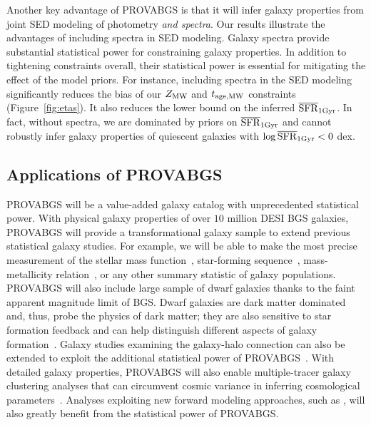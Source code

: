 Another key advantage of {\sc PROVABGS} is that it will infer galaxy
properties from joint SED modeling of photometry \emph{and spectra}. 
Our results illustrate the advantages of including spectra in SED modeling. 
Galaxy spectra provide substantial statistical power for constraining 
galaxy properties. 
In addition to tightening constraints overall, their statistical power is
essential for mitigating the effect of the model priors. 
For instance, including spectra in the SED modeling significantly reduces the
bias of our $Z_{\rm MW}$ and $t_{\rm age, MW}$ constraints (Figure~\ref{fig:etas}). 
It also reduces the lower bound on the inferred $\overline{\rm SFR}_{\rm 1Gyr}$. 
In fact, without spectra, we are dominated by priors on $\overline{\rm SFR}_{\rm 1Gyr}$ and cannot
robustly infer galaxy properties of quiescent galaxies with $\log\overline{\rm SFR}_{\rm 1Gyr} < 0$
dex.

\subsection{Applications of PROVABGS}
{\sc PROVABGS} will be a value-added galaxy catalog with unprecedented
statistical power. 
With physical galaxy properties of over $10$ million DESI BGS galaxies, 
{\sc PROVABGS} will provide a transformational galaxy sample to extend
previous statistical galaxy studies. 
For example, we will be able to make the most precise measurement of the
stellar mass function~\citep[SMF]{li2009, moustakas2013}, star-forming
sequence~\citep{noeske2007}, mass-metallicity relation~\citep{tremonti2004}, or
any other summary statistic of galaxy populations. 
{\sc PROVABGS} will also include large sample of dwarf galaxies thanks to the
faint apparent magnitude limit of BGS. 
Dwarf galaxies are dark matter dominated and, thus, probe the physics of
dark matter; they are also sensitive to star formation feedback and can help
distinguish different aspects of galaxy formation~\citep{mao2021}. 
Galaxy studies examining the galaxy-halo connection can also be extended to
exploit the additional statistical power of {\sc
PROVABGS}~\citep[\emph{e.g.}][]{tinker2011, wetzel2013, zu2015, hahn2017,
hahn2019b}. 
With detailed galaxy properties, {\sc PROVABGS} will also enable
multiple-tracer galaxy clustering analyses that can circumvent cosmic variance
in inferring cosmological parameters~\citep{seljak2009, mcdonald2009,
wang2020}.
Analyses exploiting new forward modeling approaches, such as \cite{hahn2021},
will also greatly benefit from the statistical power of {\sc PROVABGS}.

